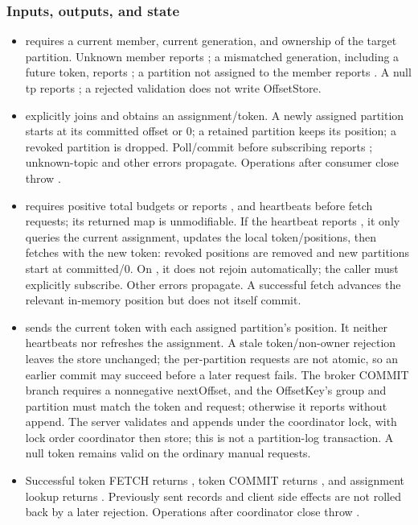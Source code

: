 \subsubsection*{Inputs, outputs, and state}
\begin{itemize}
\item {} requires a current member, current generation, and ownership of the target partition. Unknown member reports ; a mismatched generation, including a future token, reports ; a partition not assigned to the member reports . A null tp reports ; a rejected validation does not write OffsetStore.
\item {} explicitly joins and obtains an assignment/token. A newly assigned partition starts at its committed offset or 0; a retained partition keeps its position; a revoked partition is dropped. Poll/commit before subscribing reports ; unknown-topic and other errors propagate. Operations after consumer close throw .
\item {} requires positive total budgets or reports , and heartbeats before fetch requests; its returned map is unmodifiable. If the heartbeat reports , it only queries the current assignment, updates the local token/positions, then fetches with the new token: revoked positions are removed and new partitions start at committed/0. On , it does not rejoin automatically; the caller must explicitly subscribe. Other errors propagate. A successful fetch advances the relevant in-memory position but does not itself commit.
\item {} sends the current token with each assigned partition's position. It neither heartbeats nor refreshes the assignment. A stale token/non-owner rejection leaves the store unchanged; the per-partition requests are not atomic, so an earlier commit may succeed before a later request fails. The broker COMMIT branch requires a nonnegative nextOffset, and the OffsetKey's group and partition must match the token and request; otherwise it reports  without append. The server validates and appends under the coordinator lock, with lock order coordinator then store; this is not a partition-log transaction. A null token remains valid on the ordinary manual requests.
\item Successful token FETCH returns , token COMMIT returns , and assignment lookup returns . Previously sent records and client side effects are not rolled back by a later rejection. Operations after coordinator close throw .
\end{itemize}
